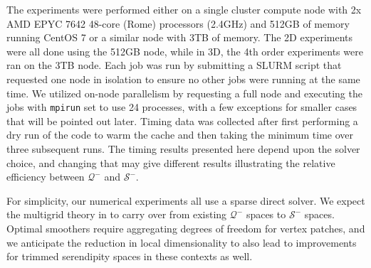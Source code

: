 \documentclass[format=acmsmall,screen,timestamp=false,a4paper]{acmart}
\newcommand\josh[1]{\textbf{\textcolor[rgb]{0,.5,1}{[Josh: #1]}}}
\begin{document}
The experiments were performed either on a single cluster compute node with 2x AMD EPYC 7642 48-core (Rome) processors (2.4GHz) and 512GB of memory running CentOS 7 or a similar node with 3TB of memory.  The 2D experiments were all done using the 512GB node, while in 3D, the 4th order experiments were ran on the 3TB node.  Each job was run by submitting a SLURM script that requested one node in isolation to ensure no other jobs were running at the same time.  We utilized on-node parallelism by requesting a full node and executing the jobs with \texttt{mpirun} set to use 24 processes, with a few exceptions for smaller cases that will be pointed out later.  Timing data was collected after first performing a dry run of the code to warm the cache and then taking the minimum time over three subsequent runs.  The timing results presented here depend upon the solver choice, and changing that may give different results illustrating the relative efficiency between $\mathcal{Q}^-$ and $\mathcal{S}^-$.  

For simplicity, our numerical experiments all use a sparse direct solver.  We expect the multigrid theory in \citet{AFW2006, AFW2010} to carry over from existing $\mathcal{Q}^-$ spaces to $\mathcal{S}^-$ spaces.  Optimal smoothers require aggregating degrees of freedom for vertex patches, and we anticipate the reduction in local dimensionality to also lead to improvements for trimmed serendipity spaces in these contexts as well.





\end{document}
